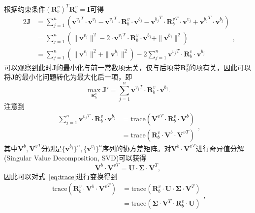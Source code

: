 根据约束条件${(\symbf{R}_{b}^{v})}^T \symbf{R}_{b}^{v} = \symbf{I}$可得
\begin{equation}
\begin{aligned}
  2\symbf{J} &= \sum_{j=1}^{n} ({\symbf{v}^{v_{j}}}^T \cdot \symbf{v}^{v_{j}} - {\symbf{v}^{v_{j}}}^T \cdot \symbf{R}_{b}^{v} \cdot \symbf{v}^{b_{j}} - {\symbf{v}^{b_{j}}}^T \cdot {\symbf{R}_{b}^{v}}^T \cdot {\symbf{v}^{v_{j}}} + {\symbf{v}^{b_{j}}}^T \cdot \symbf{v}^{b_{j}}) \\ 
  &= \sum_{j=1}^{n} (\| \symbf{v}^{v_{j}} \|^2 - 2\cdot {\symbf{v}^{v_{j}}}^T \cdot \symbf{R}_{b}^{v} \cdot \symbf{v}^{b_{j}} + \| \symbf{v}^{b_{j}} \|^2) \\
  &= \sum_{j=1}^{n} (\| \symbf{v}^{v_{j}} \|^2 + \| \symbf{v}^{b_{j}} \|^2) - 2 \sum_{j=1}^{n} {\symbf{v}^{v_{j}}}^T \cdot \symbf{R}_{b}^{v} \cdot \symbf{v}^{b_{j}}
\end{aligned},
\end{equation}
可以观察到此时$\symbf{J}$的最小化与前一常数项无关，仅与后项带$\symbf{R}_b^v$的项有关，因此可以将$\symbf{J}$的最小化问题转化为最大化后一项，即
\begin{equation}
  \max_{\symbf{R}_{b}^{v}} \symbf{J}' = \sum_{j=1}^{n} {\symbf{v}^{v_{j}}}^T \cdot \symbf{R}_{b}^{v} \cdot \symbf{v}^{b_{j}}.
\label{eq:max}
\end{equation}
注意到
\begin{equation}
\begin{aligned}
  \sum_{j=1}^{n} {\symbf{v}^{v_{j}}}^T \cdot \symbf{R}_{b}^{v} \cdot \symbf{v}^{b_{j}} &= \text{trace}({\symbf{V}^{v}}^T \cdot \symbf{R}_{b}^{v} \cdot \symbf{V}^{b}) \\ 
  &= \text{trace}( \symbf{R}_{b}^{v} \cdot \symbf{V}^{b} \cdot {\symbf{V}^{v}}^T)
\end{aligned},
\label{eq:trace}
\end{equation}
其中$\symbf{V}^{b}, {\symbf{V}^{v}}^T$分别是$\{\symbf{v}^{b_{j}}\}^n,\{\symbf{v}^{v_{j}}\}^n$序列的协方差矩阵。对$\symbf{V}^{b} \cdot {\symbf{V}^{v}}^T$进行奇异值分解(Singular Value Decomposition, SVD)可以获得
\begin{equation}
  \symbf{V}^{b} \cdot {\symbf{V}^{v}}^T = \symbf{U} \cdot \symbf{\Sigma} \cdot \symbf{V}^T,
\end{equation}
因此可以对式~\ref{eq:trace}进行变换得到
\begin{equation}
\begin{aligned}
  \text{trace}( \symbf{R}_{b}^{v} \cdot \symbf{V}^{b} \cdot {\symbf{V}^{v}}^T) &= \text{trace}(\symbf{R}_{b}^{v} \cdot \symbf{U} \cdot \symbf{\Sigma} \cdot \symbf{V}^T) \\
  &= \text{trace}(\symbf{\Sigma} \cdot \symbf{V}^T \cdot \symbf{R}_{b}^{v} \cdot \symbf{U})
\end{aligned},
\label{eq:svd}
\end{equation}

